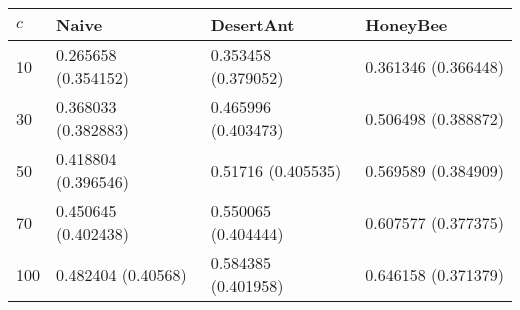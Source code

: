\begin{tabular} {|l|l|l|l|}
\hline
$c$ & Naive & DesertAnt & HoneyBee \\
\hline
10 & 0.265658 (0.354152)  & 0.353458 (0.379052)  & 0.361346 (0.366448)  \\
30 & 0.368033 (0.382883)  & 0.465996 (0.403473)  & 0.506498 (0.388872)  \\
50 & 0.418804 (0.396546)  & 0.51716 (0.405535)  & 0.569589 (0.384909)  \\
70 & 0.450645 (0.402438)  & 0.550065 (0.404444)  & 0.607577 (0.377375)  \\
100 & 0.482404 (0.40568)  & 0.584385 (0.401958)  & 0.646158 (0.371379)  \\
\hline
\end{tabular}
